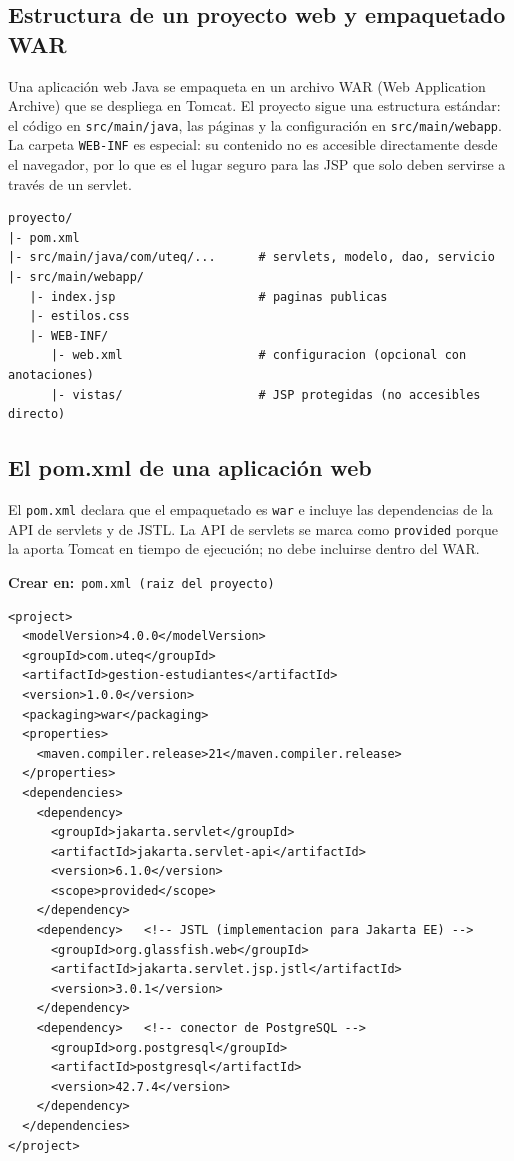\documentclass[11pt]{article}
\begin{document}
\subsection{Estructura de un proyecto web y empaquetado WAR}
Una aplicación web Java se empaqueta en un archivo WAR (Web Application Archive) que se despliega en Tomcat. El proyecto sigue una estructura estándar: el código en \texttt{src/\allowbreak{}main/\allowbreak{}java}, las páginas y la configuración en \texttt{src/\allowbreak{}main/\allowbreak{}webapp}. La carpeta \texttt{WEB-INF} es especial: su contenido no es accesible directamente desde el navegador, por lo que es el lugar seguro para las JSP que solo deben servirse a través de un servlet.

\begin{cajacodigo}
\begin{lstlisting}[style=markup]
proyecto/
|- pom.xml
|- src/main/java/com/uteq/...      # servlets, modelo, dao, servicio
|- src/main/webapp/
   |- index.jsp                    # paginas publicas
   |- estilos.css
   |- WEB-INF/
      |- web.xml                   # configuracion (opcional con anotaciones)
      |- vistas/                   # JSP protegidas (no accesibles directo)
\end{lstlisting}
\end{cajacodigo}
\vspace{2pt}
\subsection{El pom.xml de una aplicación web}
El \texttt{pom.\allowbreak{}xml} declara que el empaquetado es \texttt{war} e incluye las dependencias de la API de servlets y de JSTL. La API de servlets se marca como \texttt{provided} porque la aporta Tomcat en tiempo de ejecución; no debe incluirse dentro del WAR.

{\small\color{jwebazulo}\textbf{Crear en:}~}\texttt{pom.\allowbreak{}xml  (raiz del proyecto)}\par\nobreak\vspace{-1pt}
\begin{cajacodigo}
\begin{lstlisting}[style=xml]
<project>
  <modelVersion>4.0.0</modelVersion>
  <groupId>com.uteq</groupId>
  <artifactId>gestion-estudiantes</artifactId>
  <version>1.0.0</version>
  <packaging>war</packaging>
  <properties>
    <maven.compiler.release>21</maven.compiler.release>
  </properties>
  <dependencies>
    <dependency>
      <groupId>jakarta.servlet</groupId>
      <artifactId>jakarta.servlet-api</artifactId>
      <version>6.1.0</version>
      <scope>provided</scope>
    </dependency>
    <dependency>   <!-- JSTL (implementacion para Jakarta EE) -->
      <groupId>org.glassfish.web</groupId>
      <artifactId>jakarta.servlet.jsp.jstl</artifactId>
      <version>3.0.1</version>
    </dependency>
    <dependency>   <!-- conector de PostgreSQL -->
      <groupId>org.postgresql</groupId>
      <artifactId>postgresql</artifactId>
      <version>42.7.4</version>
    </dependency>
  </dependencies>
</project>
\end{lstlisting}
\end{cajacodigo}
\vspace{2pt}
\end{document}
